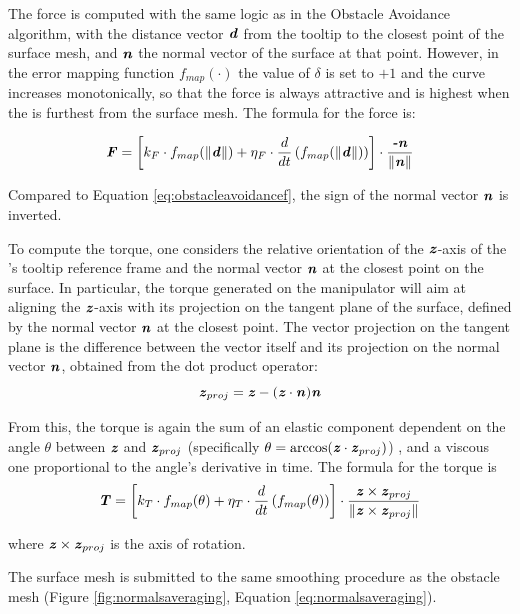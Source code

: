 \documentclass[../main.tex]{subfiles}
\begin{document}
The force is computed with the same logic as in the Obstacle Avoidance algorithm, with the distance vector $\textbf{\textit{d}}$ from the \psm tooltip to the closest point of the surface mesh, and $\textbf{\textit{n}}$ the normal vector of the surface at that point. However, in the error mapping function $f_{map}(\cdot)$ the value of $\delta$ is set to $+1$ and the curve increases monotonically, so that the force is always attractive and is highest when the \psm is furthest from the surface mesh. The formula for the force is:

\begin{equation}
    \textbf{\textit{F}} = \left[k_F\cdot f_{map}(\|\textbf{\textit{d}}\|) + \eta_F\cdot \frac{d}{dt} \left( f_{map}(\|\textbf{\textit{d}}\|)\right)\right]\cdot \frac{\textbf{\textit{-n}}}{\|\textbf{\textit{n}}\|} 
\end{equation}

Compared to Equation \ref{eq:obstacleavoidancef}, the sign of the normal vector $\textbf{\textit{n}}$ is inverted.

To compute the torque, one considers the relative orientation of the $\textbf{\textit{z}}$-axis of the \psm's tooltip reference frame and the normal vector $\textbf{\textit{n}}$ at the closest point on the surface. In particular, the torque generated on the manipulator will aim at aligning the $\textbf{\textit{z}}$-axis with its projection on the tangent plane of the surface, defined by the normal vector $\textbf{\textit{n}}$ at the closest point. The vector projection on the tangent plane is the difference between the vector itself and its projection on the normal vector $\textbf{\textit{n}}$, obtained from the dot product operator:
\begin{equation}
    \textbf{\textit{z}}_{proj} = \textbf{\textit{z}} - (\textbf{\textit{z}}\cdot\textbf{\textit{n}})\textbf{\textit{n}}
\end{equation} 

From this, the torque is again the sum of an elastic component dependent on the angle $\theta$ between $\textbf{\textit{z}}$ and $\textbf{\textit{z}}_{proj}$ (specifically $\theta = \arccos(\textbf{\textit{z}}\cdot\textbf{\textit{z}}_{proj})$) , and a viscous one proportional to the angle's derivative in time. The formula for the torque is
\begin{equation}
    \textbf{\textit{T}} = \left[k_T\cdot f_{map}(\theta) + \eta_T\cdot \frac{d}{dt} \left( f_{map}(\theta)\right)\right]\cdot \frac{\textbf{\textit{z}} \times \textbf{\textit{z}}_{proj}}{\|\textbf{\textit{z}} \times \textbf{\textit{z}}_{proj}\|}
    \label{eq:}
\end{equation}

where $\textbf{\textit{z}} \times \textbf{\textit{z}}_{proj}$ is the axis of rotation.

The surface mesh is submitted to the same smoothing procedure as the obstacle mesh (Figure \ref{fig:normalsaveraging}, Equation \ref{eq:normalsaveraging}).
\end{document}
